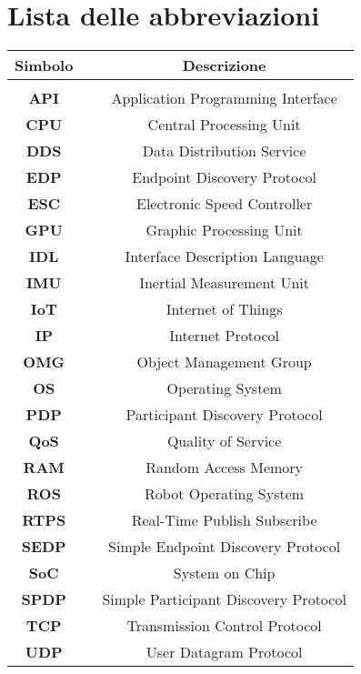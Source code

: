 

\fancyhf{}
\thispagestyle{plain}

\chapter[Lista delle abbreviazioni]{\centering Lista delle abbreviazioni}
\fontsize{14}{14}\selectfont

\begin{center}
\centering
\setlength{\tabcolsep}{15pt}
\fontsize{12}{12}\selectfont
\begin{tabular}{ c c c }
\multicolumn{1}{c}{\Large \textbf{Simbolo}} & & \multicolumn{1}{c}{\Large \textbf{Descrizione}}\\
\hline\hline\\

\textbf{API}  & & Application Programming Interface\\
\textbf{CPU}  & & Central Processing Unit\\
\textbf{DDS}  & & Data Distribution Service\\
\textbf{EDP}  & & Endpoint Discovery Protocol\\
\textbf{ESC}  & & Electronic Speed Controller\\
\textbf{GPU}  & & Graphic Processing Unit\\
\textbf{IDL}  & & Interface Description Language\\
\textbf{IMU}  & & Inertial Measurement Unit\\
\textbf{IoT}  & & Internet of Things\\
\textbf{IP}   & & Internet Protocol\\
\textbf{OMG}  & & Object Management Group\\
\textbf{OS}   & & Operating System\\
\textbf{PDP}  & & Participant Discovery Protocol\\
\textbf{QoS}  & & Quality of Service\\
\textbf{RAM}  & & Random Access Memory\\
\textbf{ROS}  & & Robot Operating System\\
\textbf{RTPS} & & Real-Time Publish Subscribe\\
\textbf{SEDP} & & Simple Endpoint Discovery Protocol\\
\textbf{SoC}  & & System on Chip\\
\textbf{SPDP} & & Simple Participant Discovery Protocol\\
\textbf{TCP}  & & Transmission Control Protocol\\
\textbf{UDP}  & & User Datagram Protocol\\

\end{tabular}
\end{center}

\restoregeometry
